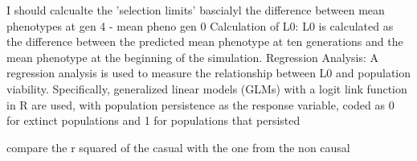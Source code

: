 \documentclass{article}
\begin{document}
I should calcualte the 'selection limits' bascialyl the difference between mean phenotypes at gen 4 - mean pheno gen 0 
Calculation of L0: L0 is calculated as the difference between the predicted mean phenotype at ten generations and the mean phenotype at the beginning of the simulation.
Regression Analysis: A regression analysis is used to measure the relationship between L0 and population viability. Specifically, generalized linear models (GLMs) with a logit link function in R are used, with population persistence as the response variable, coded as 0 for extinct populations and 1 for populations that persisted

compare the r squared of the casual with the one from the non causal

\end{document}
